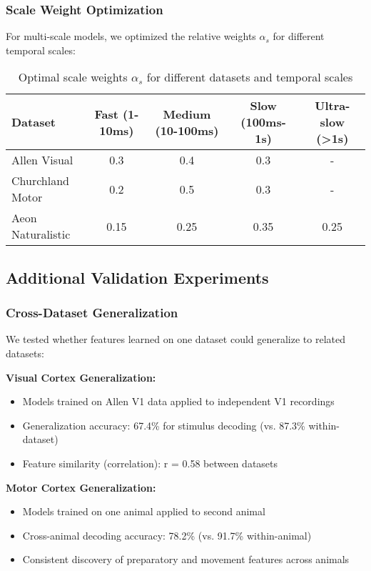 \subsubsection{Scale Weight Optimization}

For multi-scale models, we optimized the relative weights $\alpha_s$ for different temporal scales:

\begin{table}[h]
\centering
\begin{tabular}{lcccc}
\toprule
\textbf{Dataset} & \textbf{Fast (1-10ms)} & \textbf{Medium (10-100ms)} & \textbf{Slow (100ms-1s)} & \textbf{Ultra-slow (>1s)} \\
\midrule
Allen Visual & 0.3 & 0.4 & 0.3 & - \\
Churchland Motor & 0.2 & 0.5 & 0.3 & - \\
Aeon Naturalistic & 0.15 & 0.25 & 0.35 & 0.25 \\
\bottomrule
\end{tabular}
\caption{Optimal scale weights $\alpha_s$ for different datasets and temporal scales}
\label{tab:scale_weights}
\end{table}

\subsection{Additional Validation Experiments}

\subsubsection{Cross-Dataset Generalization}

We tested whether features learned on one dataset could generalize to related datasets:

\textbf{Visual Cortex Generalization:}
\begin{itemize}
\item Models trained on Allen V1 data applied to independent V1 recordings
\item Generalization accuracy: 67.4\% for stimulus decoding (vs. 87.3\% within-dataset)
\item Feature similarity (correlation): r = 0.58 between datasets
\end{itemize}

\textbf{Motor Cortex Generalization:}
\begin{itemize}
\item Models trained on one animal applied to second animal
\item Cross-animal decoding accuracy: 78.2\% (vs. 91.7\% within-animal)
\item Consistent discovery of preparatory and movement features across animals
\end{itemize}

